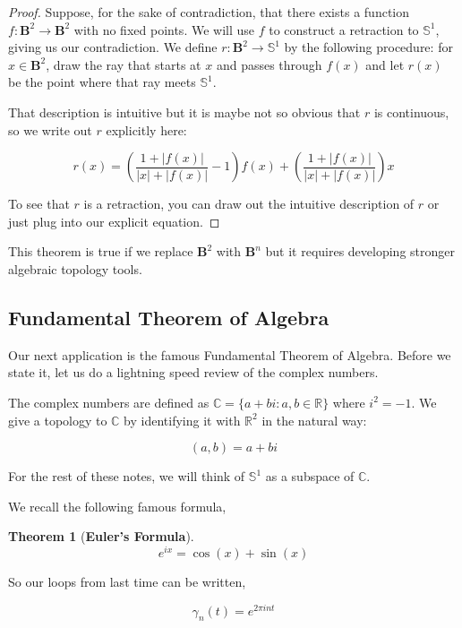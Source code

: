 \documentclass[a4paper]{article}
\newtheorem{theorem}{Theorem}
\numberwithin{theorem}{section}
\begin{document}
\begin{proof}
Suppose, for the sake of contradiction, that there exists a function $f: \textbf{B}^2 \rightarrow \textbf{B}^2$ with no fixed points. We will use $f$ to construct a retraction to $\mathbb{S}^1$, giving us our contradiction. We define $r: \textbf{B}^2 \rightarrow \mathbb{S}^1$ by the following procedure: for $x \in \textbf{B}^2$, draw the ray that starts at $x$ and passes through $f(x)$ and let $r(x)$ be the point where that ray meets $\mathbb{S}^1$.

That description is intuitive but it is maybe not so obvious that $r$ is continuous, so we write out $r$ explicitly here:

$$ r(x) = \left(\frac{1+|f(x)|}{|x| + |f(x)|} - 1\right)f(x) + \left(\frac{1+|f(x)|}{|x| + |f(x)|}\right) x $$

To see that $r$ is a retraction, you can draw out the intuitive description of $r$ or just plug into our explicit equation.

\end{proof}

This theorem is true if we replace $\textbf{B}^2$ with $\textbf{B}^n$ but it requires developing stronger algebraic topology tools.

\subsection{Fundamental Theorem of Algebra}

Our next application is the famous Fundamental Theorem of Algebra. Before we state it, let us do a lightning speed review of the complex numbers.

The complex numbers are defined as $\mathbb{C} = \{a + bi : a,b \in \mathbb{R}\}$ where $i^2 = -1$. We give a topology to $\mathbb{C}$ by identifying it with $\mathbb{R}^2$ in the natural way:

$$ (a,b) = a + bi $$

For the rest of these notes, we will think of $\mathbb{S}^1$ as a subspace of $\mathbb{C}$.

We recall the following famous formula,

\begin{theorem}[\textbf{Euler's Formula}]
$$ e^{ix} = \cos (x) + \sin (x) $$
\end{theorem}

So our loops from last time can be written,

$$ \gamma_n(t) = e^{2 \pi i n t} $$
\end{document}
